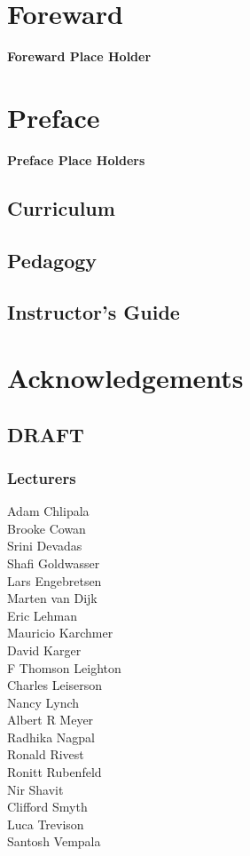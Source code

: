 \chapter*{Foreward}
\textbf{Foreward Place Holder}

\chapter*{Preface}

\textbf{Preface Place Holders}

\section*{Curriculum}

\section*{Pedagogy}

\section*{Instructor's Guide}

\chapter*{Acknowledgements}

\section*{DRAFT}

\subsection*{Lecturers}

Adam Chlipala\\
Brooke Cowan\\
Srini Devadas\\
Shafi Goldwasser\\
Lars Engebretsen\\
Marten van Dijk\\
Eric Lehman\\
Mauricio Karchmer\\
David Karger\\
F Thomson Leighton\\
Charles Leiserson\\
Nancy Lynch\\
Albert R Meyer\\
Radhika Nagpal\\
Ronald Rivest\\
Ronitt Rubenfeld\\
Nir Shavit\\
Clifford Smyth\\
Luca Trevison\\
Santosh Vempala

